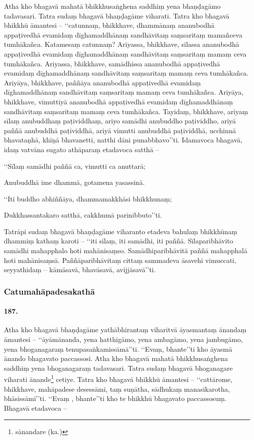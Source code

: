 Atha kho bhagavā mahatā bhikkhusaṅghena saddhiṃ yena bhaṇḍagāmo tadavasari. Tatra sudaṃ bhagavā bhaṇḍagāme viharati. Tatra kho bhagavā bhikkhū āmantesi – ‘‘catunnaṃ, bhikkhave, dhammānaṃ ananubodhā appaṭivedhā evamidaṃ dīghamaddhānaṃ sandhāvitaṃ saṃsaritaṃ mamañceva tumhākañca. Katamesaṃ catunnaṃ? Ariyassa, bhikkhave, sīlassa ananubodhā appaṭivedhā evamidaṃ dīghamaddhānaṃ sandhāvitaṃ saṃsaritaṃ mamaṃ ceva tumhākañca. Ariyassa, bhikkhave, samādhissa ananubodhā appaṭivedhā evamidaṃ dīghamaddhānaṃ sandhāvitaṃ saṃsaritaṃ mamaṃ ceva tumhākañca. Ariyāya, bhikkhave, paññāya ananubodhā appaṭivedhā evamidaṃ dīghamaddhānaṃ sandhāvitaṃ saṃsaritaṃ mamaṃ ceva tumhākañca. Ariyāya, bhikkhave, vimuttiyā ananubodhā appaṭivedhā evamidaṃ dīghamaddhānaṃ sandhāvitaṃ saṃsaritaṃ mamaṃ ceva tumhākañca. Tayidaṃ, bhikkhave, ariyaṃ sīlaṃ anubuddhaṃ paṭividdhaṃ, ariyo samādhi anubuddho paṭividdho, ariyā paññā anubuddhā paṭividdhā, ariyā vimutti anubuddhā paṭividdhā, ucchinnā bhavataṇhā, khīṇā bhavanetti, natthi dāni punabbhavo’’ti. Idamavoca bhagavā, idaṃ vatvāna sugato athāparaṃ etadavoca satthā –

‘‘Sīlaṃ samādhi paññā ca, vimutti ca anuttarā;

Anubuddhā ime dhammā, gotamena yasassinā.

‘‘Iti buddho abhiññāya, dhammamakkhāsi bhikkhunaṃ;

Dukkhassantakaro satthā, cakkhumā parinibbuto’’ti.

Tatrāpi sudaṃ bhagavā bhaṇḍagāme viharanto etadeva bahulaṃ bhikkhūnaṃ dhammiṃ kathaṃ karoti – ‘‘iti sīlaṃ, iti samādhi, iti paññā. Sīlaparibhāvito samādhi mahapphalo hoti mahānisaṃso. Samādhiparibhāvitā paññā mahapphalā hoti mahānisaṃsā. Paññāparibhāvitaṃ cittaṃ sammadeva āsavehi vimuccati, seyyathidaṃ – kāmāsavā, bhavāsavā, avijjāsavā’’ti.

\subsubsection{Catumahāpadesakathā}

\paragraph{187.} Atha kho bhagavā bhaṇḍagāme yathābhirantaṃ viharitvā āyasmantaṃ ānandaṃ āmantesi – ‘‘āyāmānanda, yena hatthigāmo, yena ambagāmo, yena jambugāmo, yena bhoganagaraṃ tenupasaṅkamissāmā’’ti. ‘‘Evaṃ, bhante’’ti kho āyasmā ānando bhagavato paccassosi. Atha kho bhagavā mahatā bhikkhusaṅghena saddhiṃ yena bhoganagaraṃ tadavasari. Tatra sudaṃ bhagavā bhoganagare viharati ānande\footnote{sānandare (ka.)} cetiye. Tatra kho bhagavā bhikkhū āmantesi – ‘‘cattārome, bhikkhave, mahāpadese desessāmi, taṃ suṇātha, sādhukaṃ manasikarotha, bhāsissāmī’’ti. ‘‘Evaṃ , bhante’’ti kho te bhikkhū bhagavato paccassosuṃ. Bhagavā etadavoca –

